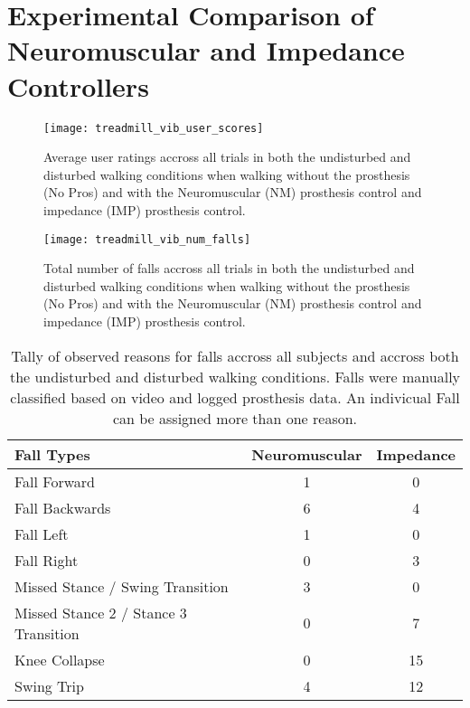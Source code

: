 \chapter{Experimental Comparison of Neuromuscular and Impedance Controllers}\label{sec:nm_vs_imp}

\begin{figure}[h]
    \centering 
    \texttt{[image: treadmill\_vib\_user\_scores]}
    \caption{Average user ratings accross all trials in both the 
    undisturbed and disturbed walking conditions when walking without the
    prosthesis (No Pros) and with the Neuromuscular (NM) prosthesis control and
    impedance (IMP) prosthesis control.}\label{fig:treadmill_user_ratings}
\end{figure}

\begin{figure}[h]
    \centering 
    \texttt{[image: treadmill\_vib\_num\_falls]}
    \caption{Total number of falls accross all trials in both the 
    undisturbed and disturbed walking conditions when walking without the
    prosthesis (No Pros) and with the Neuromuscular (NM) prosthesis control and
    impedance (IMP) prosthesis control.}\label{fig:treadmill_exp_falls}
\end{figure}

\begin{table}[h]
  \footnotesize%
  \begin{center}
    \begin{tabular}{lcc}
      \toprule
      Fall Types & Neuromuscular & Impedance \\
      \midrule
      Fall Forward &  1 &  0 \\
      Fall Backwards &  6 &  4 \\
      Fall Left &  1 &  0 \\
      Fall Right &  0 &  3 \\
      Missed Stance / Swing Transition &  3 &  0 \\
      Missed Stance 2 / Stance 3 Transition &  0 &  7 \\
      Knee Collapse & 0 & 15 \\
      Swing Trip & 4 & 12 \\
      \bottomrule
    \end{tabular}
  \end{center}
  \caption{Tally of observed reasons for falls accross all subjects and accross
  both the undisturbed and disturbed walking conditions. Falls were manually
  classified based on video and logged prosthesis data. An indivicual Fall can
  be assigned more than one reason.}\label{tab:treadmill_exp_fall_reasons}
\end{table}

